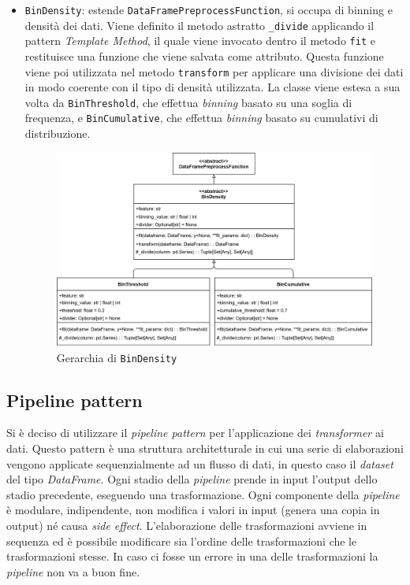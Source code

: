 \begin{itemize}
    \item \texttt{BinDensity}: estende \texttt{DataFramePreprocessFunction}, si occupa di binning e densità dei dati. Viene definito il metodo astratto \texttt{\_divide} applicando il pattern \textit{Template Method}, il quale viene invocato dentro il metodo \texttt{fit} e restituisce una funzione che viene salvata come attributo. Questa funzione viene poi utilizzata nel metodo \texttt{transform} per applicare una divisione dei dati in modo coerente con il tipo di densità utilizzata. La classe viene estesa a sua volta da \texttt{BinThreshold}, che effettua \textit{binning} basato su una soglia di frequenza, e \texttt{BinCumulative}, che effettua \textit{binning} basato su cumulativi di distribuzione.
    \begin{figure}[htbp]
        \centering
        \includegraphics[scale=0.17]{figures/UML/preprocessing/bin_density.png}
        \caption{Gerarchia di \texttt{BinDensity}}
    \end{figure}
\end{itemize}

\subsection{Pipeline pattern}

Si è deciso di utilizzare il \textit{pipeline pattern} per l'applicazione dei \textit{transformer} ai dati. Questo pattern è una struttura architetturale in cui una serie di elaborazioni vengono applicate sequenzialmente ad un flusso di dati, in questo caso il \textit{dataset} del tipo \textit{DataFrame}. Ogni stadio della \textit{pipeline} prende in input l'output dello stadio precedente, eseguendo una trasformazione. Ogni componente della \textit{pipeline} è modulare, indipendente, non modifica i valori in input (genera una copia in output) né causa \textit{side effect}. L'elaborazione delle trasformazioni avviene in sequenza ed è possibile modificare sia l'ordine delle trasformazioni che le trasformazioni stesse. In caso ci fosse un errore in una delle trasformazioni la \textit{pipeline} non va a buon fine.

